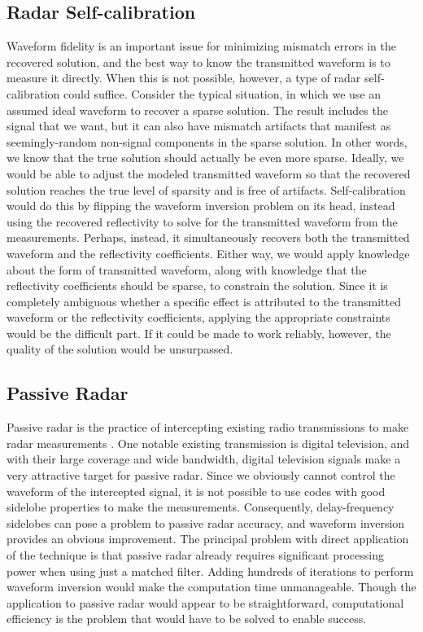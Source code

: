 \subsection{Radar Self-calibration}
Waveform fidelity is an important issue for minimizing mismatch errors in the recovered solution, and the best way to know the transmitted waveform is to measure it directly. When this is not possible, however, a type of radar self-calibration could suffice. Consider the typical situation, in which we use an assumed ideal waveform to recover a sparse solution. The result includes the signal that we want, but it can also have mismatch artifacts that manifest as seemingly-random non-signal components in the sparse solution. In other words, we know that the true solution should actually be even more sparse. Ideally, we would be able to adjust the modeled transmitted waveform so that the recovered solution reaches the true level of sparsity and is free of artifacts. Self-calibration would do this by flipping the waveform inversion problem on its head, instead using the recovered reflectivity to solve for the transmitted waveform from the measurements. Perhaps, instead, it simultaneously recovers both the transmitted waveform and the reflectivity coefficients. Either way, we would apply knowledge about the form of transmitted waveform, along with knowledge that the reflectivity coefficients should be sparse, to constrain the solution. Since it is completely ambiguous whether a specific effect is attributed to the transmitted waveform or the reflectivity coefficients, applying the appropriate constraints would be the difficult part. If it could be made to work reliably, however, the quality of the solution would be unsurpassed.

\subsection{Passive Radar}
Passive radar is the practice of intercepting existing radio transmissions to make radar measurements \autocite{LEC+13}. One notable existing transmission is digital television, and with their large coverage and wide bandwidth, digital television signals make a very attractive target for passive radar. Since we obviously cannot control the waveform of the intercepted signal, it is not possible to use codes with good sidelobe properties to make the measurements. Consequently, delay-frequency sidelobes can pose a problem to passive radar accuracy, and waveform inversion provides an obvious improvement. The principal problem with direct application of the technique is that passive radar already requires significant processing power when using just a matched filter. Adding hundreds of iterations to perform waveform inversion would make the computation time unmanageable. Though the application to passive radar would appear to be straightforward, computational efficiency is the problem that would have to be solved to enable success.

